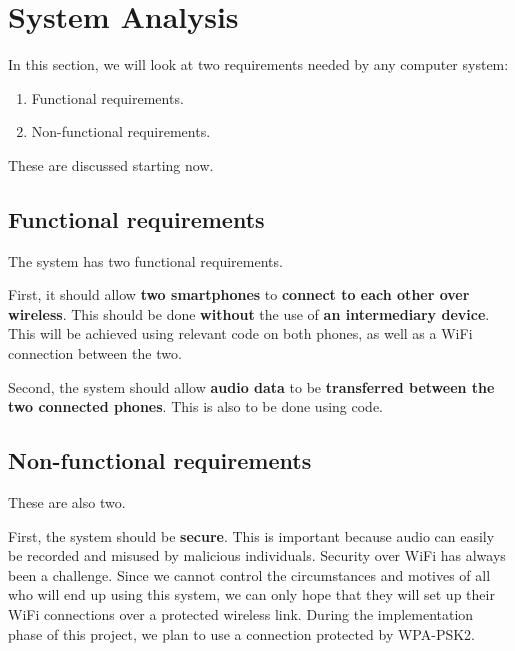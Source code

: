 \documentclass[12pt,svgnames,smaller]{article} %
\begin{document}
	
	
	\section{\textbf{System Analysis} } 
	
	In this section, we will look at two requirements needed by any computer system:
	
	\begin{enumerate}
		\item Functional requirements.
		\item Non-functional requirements.
	\end{enumerate}
	
	These are discussed starting now.

	\subsection{Functional requirements}

	The system has two functional requirements.
	
	First, it should allow \textbf{two smartphones} to \textbf{connect to each other over wireless}. This should be done \textbf{without} the use of \textbf{an intermediary device}. This will be achieved using relevant code on both phones, as well as a WiFi connection between the two.
	
	Second, the system should allow \textbf{audio data} to be \textbf{transferred between the two connected phones}. This is also to be done using code.
	

	\subsection{Non-functional requirements}
	
	These are also two.
	
	First, the system should be \textbf{secure}. This is important because audio can easily be recorded and misused by malicious individuals. Security over WiFi has always been a challenge. Since we cannot control the circumstances and motives of all who will end up using this system, we can only hope that they will set up their WiFi connections over a protected wireless link. During the implementation phase of this project, we plan to use a connection protected by WPA-PSK2.
\end{document}
